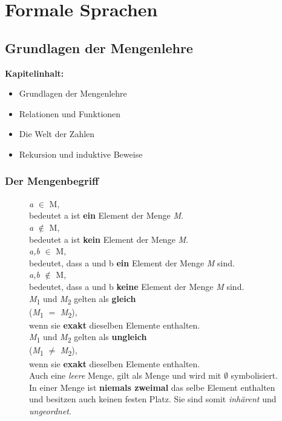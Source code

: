 \chapter{Formale Sprachen}\label{sec:Kapitel formale Sprachen}
\section{Grundlagen der Mengenlehre}\label{sec:Einführung_FS}

\textbf{Kapitelinhalt:}
\begin{itemize}
\item Grundlagen der Mengenlehre
\item Relationen und Funktionen
\item Die Welt der Zahlen
\item Rekursion und induktive Beweise 
\end{itemize}


\subsection{Der Mengenbegriff}


\begin{figure}[h]
\centering
\textit{a} $\in$ M,\\ bedeutet a ist \textbf{ein} Element der Menge \textit{M}.\\
\textit{a} $\notin$ M,\\ bedeutet a ist \textbf{kein} Element der Menge \textit{M}.\\
\textit{a,b} $\in$ M,\\ bedeutet, dass a und b \textbf{ein} Element der Menge \textit{M} sind.\\
\textit{a,b} $\notin$ M,\\ bedeutet, dass a und b \textbf{keine} Element der Menge \textit{M} sind.\\

\textit{M}\textsubscript{1} und \textit{M}\textsubscript{2} gelten als \textbf{gleich}\\ 
(\textit{M}\textsubscript{1} $=$ \textit{M}\textsubscript{2}),\\
 wenn sie \textbf{exakt} dieselben Elemente enthalten.\\

\textit{M}\textsubscript{1} und \textit{M}\textsubscript{2} gelten als \textbf{ungleich}\\ 
(\textit{M}\textsubscript{1} $\neq$ \textit{M}\textsubscript{2}),\\
 wenn sie \textbf{exakt} dieselben Elemente enthalten.\\

Auch eine \textit{leere} Menge, gilt als Menge und wird mit $\emptyset$ symbolisiert.\\
 
In einer Menge ist \textbf{niemals zweimal} das selbe Element enthalten und besitzen auch keinen festen Platz. Sie sind somit \textit{inhärent} und \textit{ungeordnet}.\\

\end{figure}


